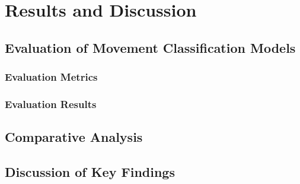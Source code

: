 %
%
\chapter{Results and Discussion}
    \section{Evaluation of Movement Classification Models}
        \subsection{Evaluation Metrics}
        \subsection{Evaluation Results}
    \section{Comparative Analysis}
    \section{Discussion of Key Findings}
\cleardoublepage